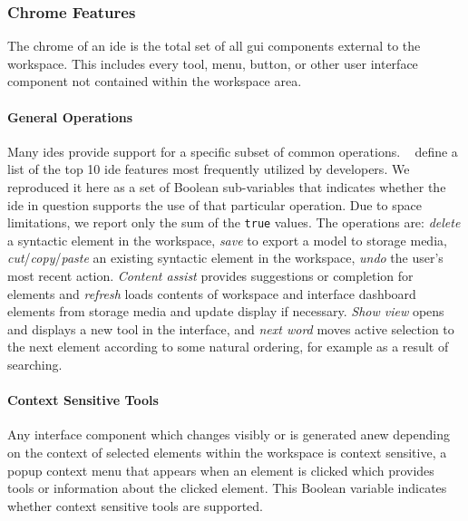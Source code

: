 \subsubsection{Chrome Features} \label{subsubsec:chrome}

The chrome of an \ac{ide} is the total set of all \acf{gui} components
external to the workspace. This includes every tool, menu, button, or other
user interface component not contained within the workspace area.


\paragraph{General Operations}
Many \acp{ide} provide support for a specific subset of common operations.
\citeauthor{murphy2006}~\cite{murphy2006} define a list of the top 10
\ac{ide} features most frequently utilized by developers. We reproduced it
here as a set of Boolean sub-variables that indicates whether the \ac{ide}
in question supports the use of that particular operation. Due to space
limitations, we report only the sum of the \texttt{true} values. The
operations are: \emph{delete} a syntactic element in the workspace,
\emph{save} to export a model to storage media,
\emph{cut}/\emph{copy}/\emph{paste} an existing syntactic element in the
workspace, \emph{undo} the user's most recent action.
\emph{Content assist} provides suggestions or completion for elements and
\emph{refresh} loads contents of workspace and interface dashboard elements
from storage media and update display if necessary. \emph{Show view} opens
and displays a new tool in the interface, and \emph{next word} moves active
selection to the next element according to some natural ordering, for
example as a result of searching.


\paragraph{Context Sensitive Tools}
Any interface component which changes visibly or is generated anew
depending on the context of selected elements within the workspace is
context sensitive, \eg a popup context menu that appears when an element is
clicked which provides tools or information about the clicked element.
This Boolean variable indicates whether context sensitive tools are
supported.



